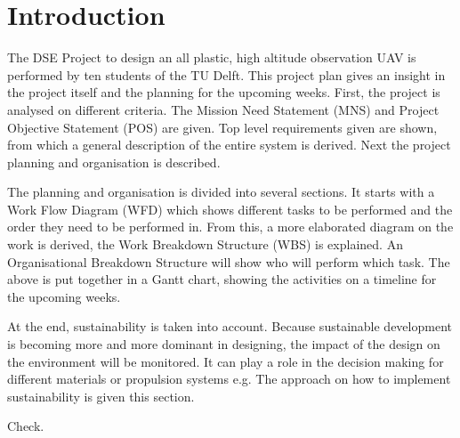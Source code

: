 \documentclass[a4paper]{report}
\begin{document}
\chapter{Introduction}
The DSE Project to design an all plastic, high altitude observation UAV is performed by ten students of the TU Delft. This project plan gives an insight in the project itself and the planning for the upcoming weeks. First, the project is analysed on different criteria. The Mission Need Statement (MNS) and Project Objective Statement (POS) are given. Top level requirements given are shown, from which a general description of the entire system is derived. Next the project planning and organisation is described.

The planning and organisation is divided into several sections. It starts with a Work Flow Diagram (WFD) which shows different tasks to be performed and the order they need to be performed in. From this, a more elaborated diagram on the work is derived, the Work Breakdown Structure (WBS) is explained. An Organisational Breakdown Structure will show who will perform which task. The above is put together in a Gantt chart, showing the activities on a timeline for the upcoming weeks.

At the end, sustainability is taken into account. Because sustainable development is becoming more and more dominant in designing, the impact of the design on the environment will be monitored. It can play a role in the decision making for different materials or propulsion systems e.g. The approach on how to implement sustainability is given this section.

Check.

\end{document}

